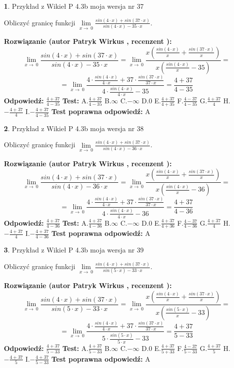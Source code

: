 \documentclass[12pt, a4paper]{article}
\theoremstyle{definition} %
\newtheorem{zad}{}
\newcommand{\zadStart}[1]{\begin{zad}#1\newline}
\newcommand{\zadStop}{\end{zad}}
\newcommand{\rozwStart}[2]{\noindent \textbf{Rozwiązanie (autor #1 , recenzent #2): }\newline}
\newcommand{\rozwStop}{\newline}
\newcommand{\odpStart}{\noindent \textbf{Odpowiedź:}\newline}
\newcommand{\odpStop}{\newline}
\newcommand{\testStart}{\noindent \textbf{Test:}\newline}
\newcommand{\testStop}{\newline}
\newcommand{\kluczStart}{\noindent \textbf{Test poprawna odpowiedź:}\newline}
\newcommand{\kluczStop}{\newline}
\begin{document}
\zadStart{Przykład z Wikieł P 4.3b moja wersja nr 37}


Obliczyć granicę funkcji $\lim\limits_{x\to\ 0}\frac{sin(4 \cdot x)+sin(37 \cdot x)}{sin(4 \cdot x)-35 \cdot x}$.
\zadStop
\rozwStart{Patryk Wirkus}{}
$$\lim\limits_{x\to\ 0}\frac{sin(4 \cdot x)+sin(37 \cdot x)}{sin(4 \cdot x)-35 \cdot x}=\lim\limits_{x\to\ 0}\frac{x(\frac{sin(4 \cdot x)}{x}+\frac{sin(37 \cdot x)}{x})}{x(\frac{sin(4 \cdot x)}{x}-35)}=$$
$$=\lim\limits_{x\to\ 0}\frac{4 \cdot \frac{sin(4 \cdot x)}{4 \cdot x}+37 \cdot \frac{sin(37 \cdot x)}{37 \cdot x}}{4 \cdot \frac{sin(4 \cdot x)}{4 \cdot x}-35}=\frac{4+37}{4-35}$$
\rozwStop
\odpStart
$\frac{4+37}{4-35}$
\odpStop
\testStart
A.$\frac{4+37}{4-35}$
B.$\infty$
C.$-\infty$
D.$0$
E.$\frac{4+37}{4+35}$
F.$\frac{4-37}{4-35}$
G.$\frac{4+37}{4}$
H.$-\frac{4+37}{4}$
I.$-\frac{4+37}{4-35}$
\testStop
\kluczStart
A
\kluczStop



\zadStart{Przykład z Wikieł P 4.3b moja wersja nr 38}


Obliczyć granicę funkcji $\lim\limits_{x\to\ 0}\frac{sin(4 \cdot x)+sin(37 \cdot x)}{sin(4 \cdot x)-36 \cdot x}$.
\zadStop
\rozwStart{Patryk Wirkus}{}
$$\lim\limits_{x\to\ 0}\frac{sin(4 \cdot x)+sin(37 \cdot x)}{sin(4 \cdot x)-36 \cdot x}=\lim\limits_{x\to\ 0}\frac{x(\frac{sin(4 \cdot x)}{x}+\frac{sin(37 \cdot x)}{x})}{x(\frac{sin(4 \cdot x)}{x}-36)}=$$
$$=\lim\limits_{x\to\ 0}\frac{4 \cdot \frac{sin(4 \cdot x)}{4 \cdot x}+37 \cdot \frac{sin(37 \cdot x)}{37 \cdot x}}{4 \cdot \frac{sin(4 \cdot x)}{4 \cdot x}-36}=\frac{4+37}{4-36}$$
\rozwStop
\odpStart
$\frac{4+37}{4-36}$
\odpStop
\testStart
A.$\frac{4+37}{4-36}$
B.$\infty$
C.$-\infty$
D.$0$
E.$\frac{4+37}{4+36}$
F.$\frac{4-37}{4-36}$
G.$\frac{4+37}{4}$
H.$-\frac{4+37}{4}$
I.$-\frac{4+37}{4-36}$
\testStop
\kluczStart
A
\kluczStop



\zadStart{Przykład z Wikieł P 4.3b moja wersja nr 39}


Obliczyć granicę funkcji $\lim\limits_{x\to\ 0}\frac{sin(4 \cdot x)+sin(37 \cdot x)}{sin(5 \cdot x)-33 \cdot x}$.
\zadStop
\rozwStart{Patryk Wirkus}{}
$$\lim\limits_{x\to\ 0}\frac{sin(4 \cdot x)+sin(37 \cdot x)}{sin(5 \cdot x)-33 \cdot x}=\lim\limits_{x\to\ 0}\frac{x(\frac{sin(4 \cdot x)}{x}+\frac{sin(37 \cdot x)}{x})}{x(\frac{sin(5 \cdot x)}{x}-33)}=$$
$$=\lim\limits_{x\to\ 0}\frac{4 \cdot \frac{sin(4 \cdot x)}{4 \cdot x}+37 \cdot \frac{sin(37 \cdot x)}{37 \cdot x}}{5 \cdot \frac{sin(5 \cdot x)}{5 \cdot x}-33}=\frac{4+37}{5-33}$$
\rozwStop
\odpStart
$\frac{4+37}{5-33}$
\odpStop
\testStart
A.$\frac{4+37}{5-33}$
B.$\infty$
C.$-\infty$
D.$0$
E.$\frac{4+37}{5+33}$
F.$\frac{4-37}{5-33}$
G.$\frac{4+37}{5}$
H.$-\frac{4+37}{5}$
I.$-\frac{4+37}{5-33}$
\testStop
\kluczStart
A
\kluczStop
\end{document}
